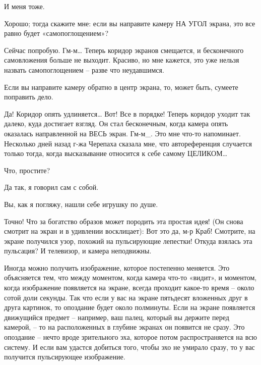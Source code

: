 \documentclass[../main.tex]{subfiles}
\begin{document}
\begin{dialogue}
 И меня тоже.

 Хорошо; тогда скажите мне: если вы направите камеру НА УГОЛ экрана, это все равно будет «самопоглощением»?

 Сейчас попробую. Гм-м\ldots{} Теперь коридор экранов смещается, и бесконечного самовложения больше не выходит. Красиво, но мне кажется, это уже нельзя назвать самопоглощением \--- разве что неудавшимся.

 Если вы направите камеру обратно в центр экрана, то, может быть, сумеете поправить дело.

 Да! Коридор опять удлиняется\ldots{} Вот! Все в порядке! Теперь коридор уходит так далеко, куда достигает взгляд. Он стал бесконечным, когда камера опять оказалась направленной на ВЕСЬ экран. Гм-м\_. Это мне что-то напоминает. Несколько дней назад г-жа Черепаха сказала мне, что автореференция случается только тогда, когда высказывание относится к себе самому ЦЕЛИКОМ\ldots{}

 Что, простите?

 Да так, я говорил сам с собой.


 Вы, как я погляжу, нашли себе игрушку по душе.

 Точно! Что за богатство образов может породить эта простая идея! (Он снова смотрит на экран и в удивлении восклицает): Вот это да, м-р Краб! Смотрите, на экране получился узор, похожий на пульсирующие лепестки! Откуда взялась эта пульсация? И телевизор, и камера неподвижны.

 Иногда можно получить изображение, которое постепенно меняется. Это объясняется тем, что между моментом, когда камера что-то «видит», и моментом, когда изображение появляется на экране, всегда проходит какое-то время \--- около сотой доли секунды. Так что если у вас на экране пятьдесят вложенных друг в друга картинок, то опоздание будет около полминуты. Если на экране появляется движущийся предмет \--- например, ваш палец, который вы держите перед камерой, \--- то на расположенных в глубине экранах он появится не сразу. Это опоздание \--- нечто вроде зрительного эха, которое потом распространяется на всю систему. И если вам удастся добиться того, чтобы эхо не умирало сразу, то у вас получится пульсирующее изображение.


\end{dialogue}
\end{document}
